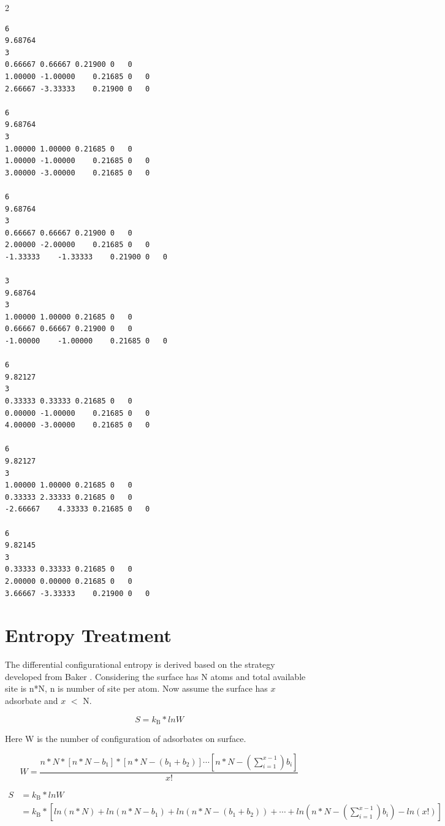\documentclass[11pt]{article}
\begin{document}
\begin{multicols} {2}
\begin{verbatim}
6				
9.68764				
3				
0.66667	0.66667	0.21900	0	0
1.00000	-1.00000	0.21685	0	0
2.66667	-3.33333	0.21900	0	0
				
6				
9.68764				
3				
1.00000	1.00000	0.21685	0	0
1.00000	-1.00000	0.21685	0	0
3.00000	-3.00000	0.21685	0	0
				
6				
9.68764				
3				
0.66667	0.66667	0.21900	0	0
2.00000	-2.00000	0.21685	0	0
-1.33333	-1.33333	0.21900	0	0
				
3				
9.68764				
3				
1.00000	1.00000	0.21685	0	0
0.66667	0.66667	0.21900	0	0
-1.00000	-1.00000	0.21685	0	0
				
6				
9.82127				
3				
0.33333	0.33333	0.21685	0	0
0.00000	-1.00000	0.21685	0	0
4.00000	-3.00000	0.21685	0	0
				
6				
9.82127				
3				
1.00000	1.00000	0.21685	0	0
0.33333	2.33333	0.21685	0	0
-2.66667	4.33333	0.21685	0	0
				
6				
9.82145				
3				
0.33333	0.33333	0.21685	0	0
2.00000	0.00000	0.21685	0	0
3.66667	-3.33333	0.21900	0	0
\end{verbatim}

\end{multicols}

\clearpage
\section{Entropy Treatment} \label{entropytreatment}

The differential configurational entropy is derived based on the strategy developed from Baker \cite{Baker1966}. Considering the surface has N atoms and total available site is n*N, n is number of site per atom. Now assume the surface has $x$ adsorbate and $x$ $<$ N.

\begin{equation}
S = k_\mathrm{B}*ln W
\end{equation}

\noindent
Here W is the number of configuration of adsorbates on surface.

\begin{equation}
W = \frac{n*N*[n*N-b_{1}]*[n*N-(b_{1}+b_{2})]\cdots[n*N-(\sum_{i=1}^{x-1})b_{i}]}{x!} 
\end{equation}

\begin{equation}
\begin{aligned}
S & = k_\mathrm{B}*ln W \\
   & =  k_\mathrm{B}*[ln(n*N)+ln(n*N-b_{1})+ln(n*N-(b_{1}+b_{2}))+\cdots+ln(n*N-(\sum_{i=1}^{x-1})b_{i})-ln(x!)]\\
\end{aligned}
\end{equation}
\end{document}
